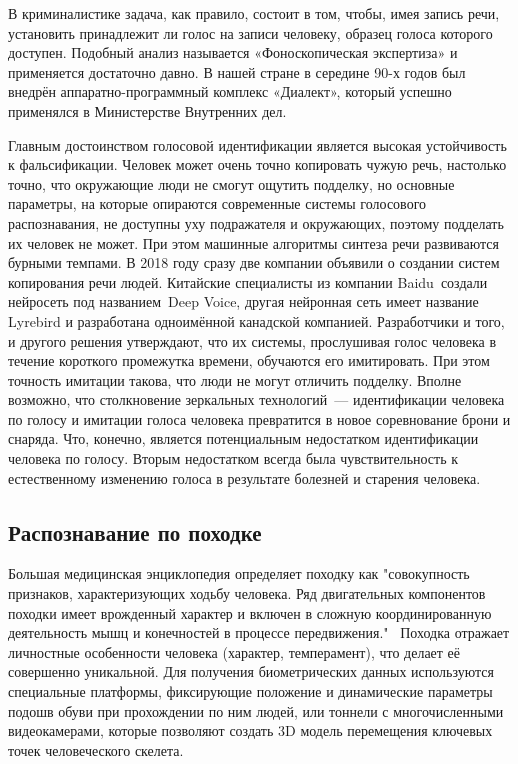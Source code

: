 \documentclass[14pt, a4paper]{extarticle}
\begin{document}
В криминалистике задача, как правило, состоит в том, чтобы, имея запись речи, установить принадлежит ли голос на записи человеку, образец голоса которого доступен. Подобный анализ называется «Фоноскопическая экспертиза» и применяется достаточно давно. В нашей стране в середине 90-х годов был внедрён аппаратно-программный комплекс «Диалект», который успешно применялся в Министерстве Внутренних дел.


Главным достоинством голосовой идентификации является высокая устойчивость к фальсификации. Человек может очень точно копировать чужую речь, настолько точно, что окружающие люди не смогут ощутить подделку, но основные параметры, на которые опираются современные системы голосового распознавания, не доступны уху подражателя и окружающих, поэтому подделать их человек не может. При этом машинные алгоритмы синтеза речи развиваются бурными темпами. В 2018 году сразу две компании объявили о создании систем копирования речи людей. Китайские специалисты из компании Baidu создали нейросеть под названием Deep Voice, другая нейронная сеть имеет название Lyrebird и разработана одноимённой канадской компанией. Разработчики и того, и другого решения утверждают, что их системы, прослушивая голос человека в течение короткого промежутка времени, обучаются его имитировать. При этом точность имитации такова, что люди не могут отличить подделку. Вполне возможно, что столкновение зеркальных технологий~--- идентификации человека по голосу и имитации голоса человека превратится в новое соревнование брони и снаряда. Что, конечно, является потенциальным недостатком идентификации человека по голосу. Вторым недостатком всегда была чувствительность к естественному изменению голоса в результате болезней и старения человека. 
\subsection{Распознавание по походке}
Большая медицинская энциклопедия определяет походку как "совокупность признаков, характеризующих ходьбу человека. Ряд двигательных компонентов походки имеет врожденный характер и включен в сложную координированную деятельность мышц и конечностей в процессе передвижения."\ \cite{petrovskiy1974bme} Походка отражает личностные особенности человека (характер, темперамент), что делает её совершенно уникальной. Для получения биометрических данных используются специальные платформы, фиксирующие положение и динамические параметры подошв обуви при прохождении по ним людей, или тоннели с многочисленными видеокамерами, которые позволяют создать 3D модель перемещения ключевых точек человеческого скелета.
\end{document}
